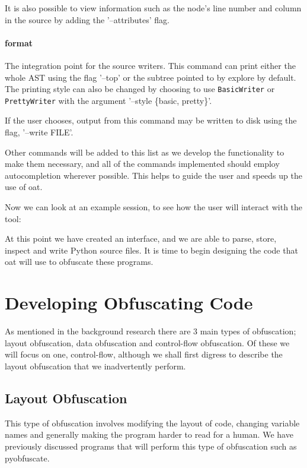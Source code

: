 \documentclass{report}
\begin{document}
It is also possible to view information such as the node's line number and column in the source by adding the '--attributes' flag.

\paragraph{format}

The integration point for the source writers. This command can print either the whole AST using the flag '--top' or the subtree pointed
to by explore by default. The printing style can also be changed by choosing to use \texttt{BasicWriter} or \texttt{PrettyWriter} with
the argument '--style \{basic, pretty\}'.

If the user chooses, output from this command may be written to disk using the flag, '--write FILE'.

Other commands will be added to this list as we develop the functionality to make them necessary, and all of the commands implemented
should employ autocompletion wherever possible. This helps to guide the user and speeds up the use of oat.

Now we can look at an example session, to see how the user will interact with the tool:



At this point we have created an interface, and we are able to parse, store, inspect and write Python source
files. It is time to begin designing the code that oat will use to obfuscate these programs.

\section{Developing Obfuscating Code}

As mentioned in the background research there are 3 main types of obfuscation; layout obfuscation, data
obfuscation and control-flow obfuscation. Of these we will focus on one, control-flow, although we shall
first digress to describe the layout obfuscation that we inadvertently perform.

\subsection{Layout Obfuscation}

This type of obfuscation involves modifying the layout of code, changing variable names and
generally making the program harder to read for a human. We have previously discussed programs that will
perform this type of obfuscation such as pyobfuscate.
\end{document}
